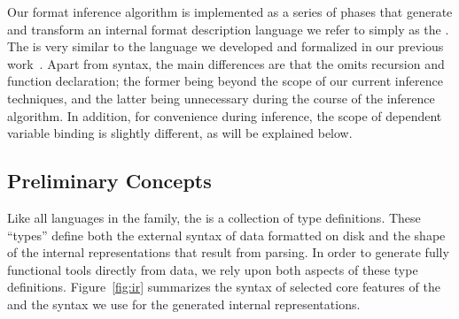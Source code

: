 Our format inference algorithm is implemented as a series of phases that
generate and transform an internal format description language we
refer to simply as the \ir.  The \ir{} is very similar to
the \ipads{} language we developed and formalized in our previous 
work~\cite{fisher+:popl06}.  Apart from syntax, the main differences 
are that the \ir{} omits recursion and function declaration; the former
being beyond the scope of our current inference techniques, and the 
latter being unnecessary during the course of the inference algorithm.  
In addition, for convenience during inference, the scope of dependent 
variable binding is slightly different, as will be explained below.

\subsection{Preliminary Concepts}

Like all languages in the \pads{} family, the \ir{} is a collection of
type definitions.  These ``types'' define both the external syntax of
data formatted on disk and the shape of the internal representations
that result from parsing.  In order to generate fully functional tools
directly from data, we rely upon both aspects of these type definitions.
Figure~\ref{fig:ir} summarizes the syntax of selected core features of 
the \ir{} and the syntax we use for the generated internal representations.


